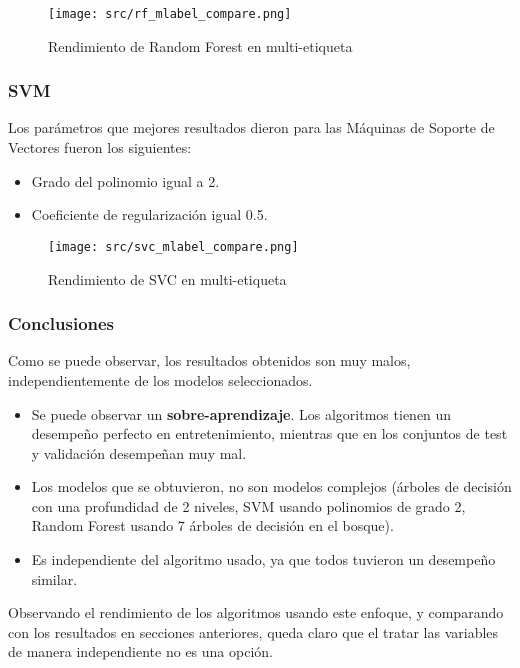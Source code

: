 \begin{figure}[H]
	\centering
	\texttt{[image: src/rf\_mlabel\_compare.png]}
	\caption{Rendimiento de Random Forest en multi-etiqueta}
	\label{fig:rfml_cmp}
\end{figure}
\subsubsection*{SVM}
Los parámetros que mejores resultados dieron para las Máquinas de Soporte de Vectores fueron los siguientes:
\begin{itemize}
	\item Grado del polinomio igual a 2.
	\item Coeficiente de regularización igual 0.5.
\end{itemize}

\begin{figure}[H]
	\centering
	\texttt{[image: src/svc\_mlabel\_compare.png]}
	\caption{Rendimiento de SVC en multi-etiqueta}
	\label{fig:svcml_cmp}
\end{figure}
\subsubsection*{Conclusiones}
Como se puede observar, los resultados obtenidos son muy malos, independientemente de los modelos seleccionados.
\begin{itemize}
	\item Se puede observar un \textbf{sobre-aprendizaje}. Los algoritmos tienen un desempeño perfecto en entretenimiento, mientras que en los conjuntos de test y validación desempeñan muy mal.
	\item Los modelos que se obtuvieron, no son modelos complejos (árboles de decisión con una profundidad de 2 niveles, SVM usando polinomios de grado 2, Random Forest usando 7 árboles de decisión en el bosque).
	\item Es independiente del algoritmo usado, ya que todos tuvieron un desempeño similar.
\end{itemize}
Observando el rendimiento de los algoritmos usando este enfoque, y comparando con los resultados en secciones anteriores, queda claro que el tratar las variables de manera independiente no es una opción.
